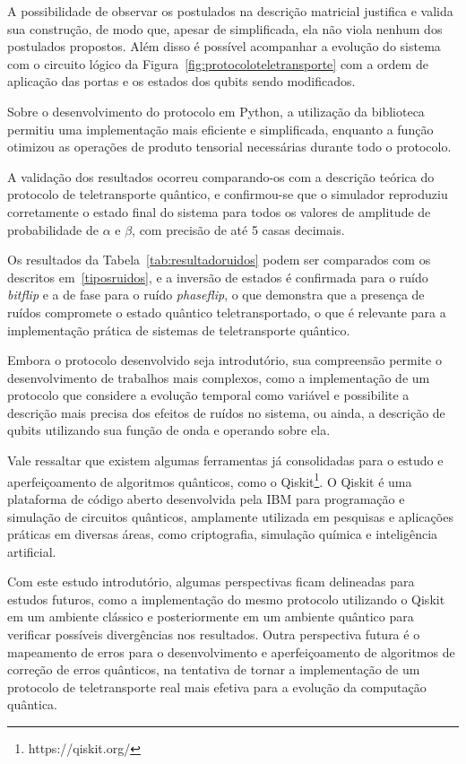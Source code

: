 A possibilidade de observar os postulados na descrição matricial justifica e valida sua construção, de modo que, apesar de simplificada, ela não viola nenhum dos postulados propostos. Além disso é possível acompanhar a evolução do sistema com o circuito lógico da Figura~\ref{fig:protocoloteletransporte} com a ordem de aplicação das portas e os estados dos qubits sendo modificados.

Sobre o desenvolvimento do protocolo em Python, a utilização da biblioteca  permitiu uma implementação mais eficiente e simplificada, enquanto a função  otimizou as operações de produto tensorial necessárias durante todo o protocolo.

A validação dos resultados ocorreu comparando-os com a descrição teórica do protocolo de teletransporte quântico, e confirmou-se que o simulador reproduziu corretamente o estado final do sistema para todos os valores de amplitude de probabilidade de $\alpha$ e $\beta$, com precisão de até 5 casas decimais.

Os resultados da Tabela~\ref{tab:resultadoruidos} podem ser comparados com os descritos em~\ref{tiposruidos}, e a inversão de estados é confirmada para o ruído \textit{bitflip} e a de fase para o ruído \textit{phaseflip}, o que demonstra que a presença de ruídos compromete o estado quântico teletransportado, o que é relevante para a implementação prática de sistemas de teletransporte quântico.

Embora o protocolo desenvolvido seja introdutório, sua compreensão permite o desenvolvimento de trabalhos mais complexos, como a implementação de um protocolo que considere a evolução temporal como variável e possibilite a descrição mais precisa dos efeitos de ruídos no sistema, ou ainda, a descrição de qubits utilizando sua função de onda e operando sobre ela.

Vale ressaltar que existem algumas ferramentas já consolidadas para o estudo e aperfeiçoamento de algoritmos quânticos, como o Qiskit\footnote{https://qiskit.org/}. O Qiskit é uma plataforma de código aberto desenvolvida pela IBM para programação e simulação de circuitos quânticos, amplamente utilizada em pesquisas e aplicações práticas em diversas áreas, como criptografia, simulação química e inteligência artificial.

Com este estudo introdutório, algumas perspectivas ficam delineadas para estudos futuros, como a implementação do mesmo protocolo utilizando o Qiskit em um ambiente clássico e posteriormente em um ambiente quântico para verificar possíveis divergências nos resultados. Outra perspectiva futura é o mapeamento de erros para o desenvolvimento e aperfeiçoamento de algoritmos de correção de erros quânticos, na tentativa de tornar a implementação de um protocolo de teletransporte real mais efetiva para a evolução da computação quântica.

